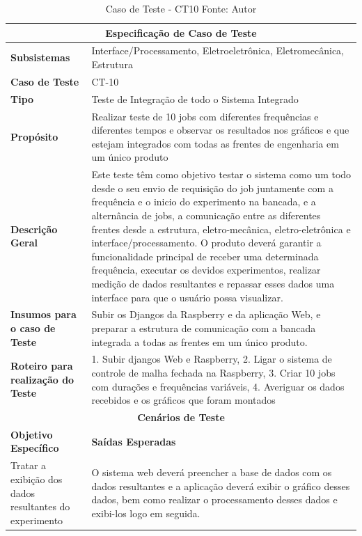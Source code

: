 \begin{table}[H]
    \begin{center}
        \begin{tabular}{|p{5cm}|p{12cm}|}
            \hline
            \multicolumn{2}{|c|}{\textbf{Especificação de Caso de Teste}} \\ \hline
                \textbf{Subsistemas}                               &  Interface/Processamento, Eletroeletrônica, Eletromecânica, Estrutura \\ \hline
                \textbf{Caso de Teste}                             & CT-10 \\ \hline
                \textbf{Tipo}                                             & Teste de Integração de todo o Sistema Integrado \\ \hline
                \textbf{Propósito}                                     & Realizar teste de 10 jobs com diferentes frequências e diferentes tempos e observar os resultados nos gráficos e que estejam integrados com todas as frentes de engenharia em um único produto \\ \hline
                \textbf{Descrição Geral}                           & Este teste têm como objetivo testar o sistema como um todo desde o seu envio de requisição do job juntamente com a frequência e o inicio do experimento na bancada, e a alternância de jobs, a comunicação entre as diferentes frentes desde a estrutura, eletro-mecânica, eletro-eletrônica e interface/processamento. O produto deverá garantir a funcionalidade principal de receber uma determinada frequência, executar os devidos experimentos, realizar medição de dados resultantes e repassar esses dados uma interface para que o usuário possa visualizar. \\ \hline
                \textbf{Insumos para o caso de Teste}    & Subir os Djangos da Raspberry e da aplicação Web, e preparar a estrutura de comunicação com a bancada integrada a todas as frentes em um único produto. \\ \hline
                \textbf{Roteiro para realização do Teste}&  1. Subir djangos Web e Raspberry, 2. Ligar o sistema de controle de malha fechada na Raspberry, 3. Criar 10 jobs com durações e frequências variáveis,  4. Averiguar os dados recebidos e os gráficos que foram montados  \\ \hline
            \multicolumn{2}{|c|}{\textbf{Cenários de Teste}} \\ \hline
                \textbf{Objetivo Específico}                      & \textbf{Saídas Esperadas} \\ \hline
                Tratar a exibição dos dados resultantes do experimento & O sistema web deverá preencher a base de dados com os dados resultantes e a aplicação deverá exibir o gráfico desses dados, bem como realizar o processamento desses dados e exibi-los logo em seguida. \\ \hline
        \end{tabular}
    \end{center}
    \caption[Caso de Teste - CT10]{Caso de Teste - CT10
    \protect Fonte: Autor}
    \label{CT-10}
\end{table}
